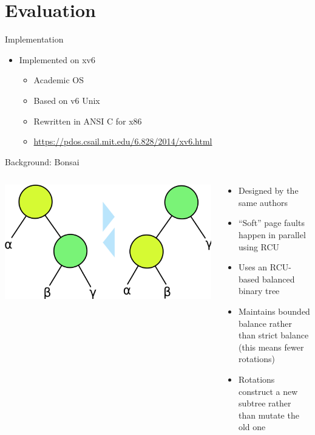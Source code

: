 \documentclass[aspectratio=169]{beamer}
\newcommand{\bi}{\begin{itemize}}
\newcommand{\ei}{\end{itemize}}
\begin{document}
\section{Evaluation}

\begin{frame}{Implementation}
  \begin{center}
    \bi
  \item Implemented on xv6
    \bi
  \item Academic OS
  \item Based on v6 Unix
  \item Rewritten in ANSI C for x86
  \item \url{https://pdos.csail.mit.edu/6.828/2014/xv6.html}
    \ei
    \ei
  \end{center}
\end{frame}

\begin{frame}{Background: Bonsai}
  \begin{columns}[T]
    \begin{column}{0.6\textwidth}
      \begin{center}
        \includegraphics[scale=0.2]{./figures/Binary_tree_rotation.png}
      \end{center}
    \end{column}
    \begin{column}{0.4\textwidth}
      \bi
    \item Designed by the same authors
    \item ``Soft'' page faults happen in parallel using RCU
    \item Uses an RCU-based balanced binary tree
    \item Maintains bounded balance rather than strict balance\\
      (this means fewer rotations)
    \item Rotations construct a new subtree rather than mutate the old one
      \ei
    \end{column}
  \end{columns}
\end{frame}
\end{document}
